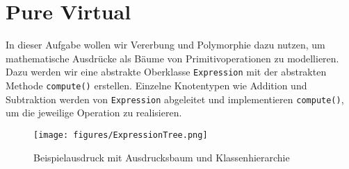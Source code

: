 \section{Pure Virtual}
In dieser Aufgabe wollen wir Vererbung und Polymorphie dazu nutzen, um mathematische Ausdrücke als Bäume von Primitivoperationen zu modellieren.
Dazu werden wir eine abstrakte Oberklasse \texttt{Expression} mit der abstrakten Methode \texttt{compute()} erstellen.
Einzelne Knotentypen wie Addition und Subtraktion werden von \texttt{Expression} abgeleitet und implementieren \texttt{compute()}, um die jeweilige Operation zu realisieren.
\begin{figure}[h]
\begin{center}
	\texttt{[image: figures/ExpressionTree.png]}\\
	\caption{Beispielausdruck mit Ausdrucksbaum und Klassenhierarchie}
\end{center}
\end{figure}


